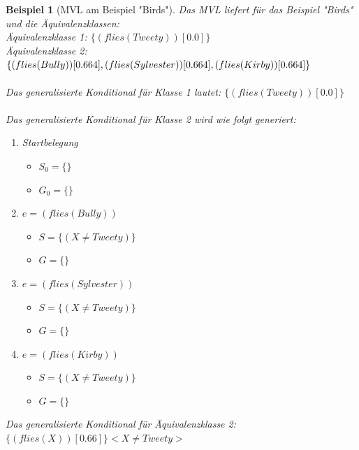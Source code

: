 \documentclass[draft]{scrreprt}
\newtheorem{Bsp}{Beispiel}[section]
\begin{document}
\begin{Bsp}[MVL am Beispiel "{}Birds"{}]
	Das MVL liefert für das Beispiel "{}Birds"{} und die Äquivalenzklassen:\\
Äquivalenzklasse 1: $\{(flies(Tweety))[0.0]\}$\\
Äquivalenzklasse 2: $\{(flies(Bully))[0.664], (flies(Sylvester))[0.664],\\ (flies(Kirby))[0.664]\}$\\
\\
Das generalisierte Konditional für Klasse 1 lautet: $\{(flies(Tweety))[0.0]\}$\\
\\
Das generalisierte Konditional für Klasse 2 wird wie folgt generiert:

\begin{enumerate}
	\item Startbelegung
	\begin{itemize}
		\item $ S_0 = \{\}$ 
		\item $ G_0 = \{\} $
	\end{itemize}
	\item $ e = (flies(Bully)) $
	\begin{itemize}
		\item $ S = \{(X \neq Tweety)\}$ 
		\item $ G = \{\} $
	\end{itemize}
	\item $ e = (flies(Sylvester)) $
	\begin{itemize}
		\item $ S = \{(X \neq Tweety)\}$ 
		\item $ G = \{\} $
	\end{itemize}
		\item $ e = (flies(Kirby)) $
	\begin{itemize}
		\item $ S = \{(X \neq Tweety)\}$ 
		\item $ G = \{\} $
	\end{itemize}	
\end{enumerate}
Das generalisierte Konditional für Äquivalenzklasse 2:\\
 $\{(flies(X))[0.66]\} <X \neq Tweety>$\\
\end{Bsp}
\end{document}
